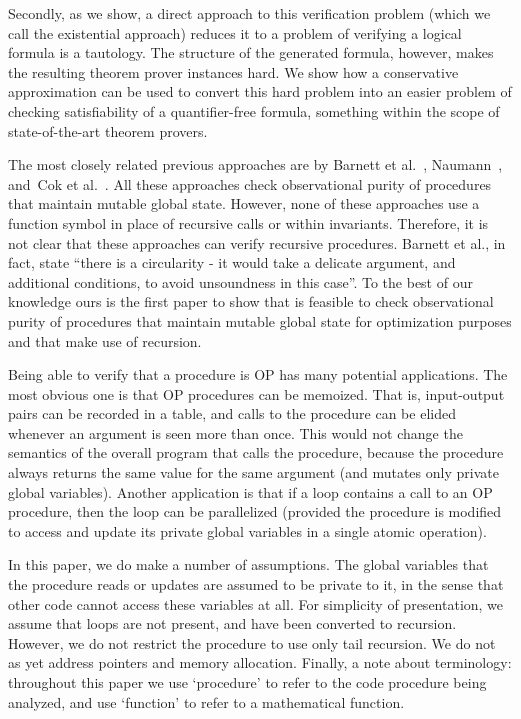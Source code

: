 Secondly, as we show, a direct approach to this verification problem (which we
call the existential approach) reduces it to a problem of verifying a logical formula
is a tautology. The structure of the generated formula, however, makes the resulting
theorem prover instances hard. We show how a conservative approximation can be
used to convert this hard problem into an easier problem of checking satisfiability
of a quantifier-free formula, something within the scope of state-of-the-art theorem
provers.


The most closely related previous approaches are by Barnett et
al.~\cite{barnett200499,barnett2006allowing},
Naumann~\cite{naumann2007observational}, and~Cok et
al.~\cite{cok2008extensions}.  All these approaches check observational
purity of procedures that maintain mutable global state. However, none of
these approaches use a function symbol in place of recursive calls or
within invariants. Therefore, it is not clear that these approaches can
verify recursive procedures. 
Barnett et al., in fact, state ``there is a circularity - it would take a delicate argument, and additional conditions,
to avoid unsoundness in this case''.
To the best of our knowledge ours is the first paper to show that is
feasible to check observational purity of procedures that maintain mutable
global state for optimization purposes and that make use of recursion.

Being able to verify that a procedure is OP has many potential
applications. The most obvious one is that OP procedures can be
memoized. That is, input-output pairs can be recorded in a table, and calls
to the procedure can be elided whenever an argument is seen more than
once. This would not change the semantics of the overall program that calls
the procedure, because the procedure always returns the same value for the
same argument (and mutates only private global variables). Another
application is that if a loop contains a call to an OP procedure, then the
loop can be parallelized (provided the procedure is modified to access and
update its private global variables in a single atomic operation).

In this paper, we do make a number of assumptions. The global variables
that the procedure reads or updates are assumed to be private to it, in the
sense that other code cannot access these variables at all.  For simplicity
of presentation, we assume that loops are not present, and have been
converted to recursion. However, we do not restrict the procedure to use
only tail recursion. We do not as yet address pointers and memory
allocation. Finally, a note about terminology: throughout this paper we
use `procedure' to refer to the code procedure being analyzed, and use
`function' to refer to a mathematical function. 

